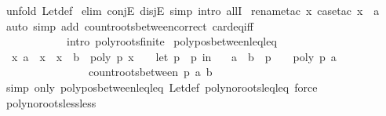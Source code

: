 \begin{isabellebody}
\isamarkupfalse%
\ {\isacharparenleft}unfold\ Let{\isacharunderscore}def{\isacharparenright}\isanewline
{}\isamarkupfalse%
\ {\isacharparenleft}elim\ conjE\ disjE{\isacharcomma}\ simp{\isacharcomma}\ intro\ allI{\isacharparenright}\isanewline
{}\isamarkupfalse%
\ {\isacharparenleft}rename{\isacharunderscore}tac\ x{\isacharcomma}\ case{\isacharunderscore}tac\ {\isachardoublequoteopen}x\ {\isacharequal}\ a{\isachardoublequoteclose}{\isacharparenright}\isanewline
{}\isamarkupfalse%
\ {\isacharparenleft}auto\ simp\ add{\isacharcolon}\ count{\isacharunderscore}roots{\isacharunderscore}between{\isacharunderscore}correct\ card{\isacharunderscore}eq{\isacharunderscore}{}{\isacharunderscore}iff\isanewline
\ \ \ \ \ \ \ \ \ \ \ \ intro{\isacharcolon}\ poly{\isacharunderscore}roots{\isacharunderscore}finite{\isacharparenright}\isanewline
{}\isamarkupfalse%
%
\endisatagproof
{\isafoldproof}%
%
\isadelimproof
\isanewline
%
\endisadelimproof
\isanewline
{}\isamarkupfalse%
\ poly{\isacharunderscore}pos{\isacharunderscore}between{\isacharunderscore}leq{\isacharunderscore}leq{\isacharcolon}\isanewline
\ \ {\isachardoublequoteopen}{\isacharparenleft}{\isasymforall}x{\isachardot}\ a\ {\isasymle}\ x\ {\isasymand}\ x\ {\isasymle}\ b\ {\isasymlongrightarrow}\ poly\ p\ x\ {\isachargreater}\ {}{\isacharparenright}\ {\isasymlongleftrightarrow}\ {\isacharparenleft}let\ p\ {\isacharequal}\ p\ in\isanewline
\ \ \ {\isacharparenleft}a\ {\isachargreater}\ b\ {\isasymor}\ {\isacharparenleft}p\ {\isasymnoteq}\ {}\ {\isasymand}\ poly\ p\ a\ {\isachargreater}\ {}\ {\isasymand}\ \isanewline
\ \ \ \ \ \ \ \ \ \ \ \ \ \ \ \ count{\isacharunderscore}roots{\isacharunderscore}between\ p\ a\ b\ {\isacharequal}\ {}{\isacharparenright}{\isacharparenright}{\isacharparenright}{\isachardoublequoteclose}\isanewline
%
\isadelimproof
%
\endisadelimproof
%
\isatagproof
{}\isamarkupfalse%
\ {\isacharparenleft}simp\ only{\isacharcolon}\ poly{\isacharunderscore}pos{\isacharunderscore}between{\isacharunderscore}leq{\isacharunderscore}leq\ Let{\isacharunderscore}def\ poly{\isacharunderscore}no{\isacharunderscore}roots{\isacharunderscore}leq{\isacharunderscore}leq{\isacharcomma}\ force{\isacharparenright}%
\endisatagproof
{\isafoldproof}%
%
\isadelimproof
\isanewline
%
\endisadelimproof
\isanewline
\isanewline
\isanewline
{}\isamarkupfalse%
\ poly{\isacharunderscore}no{\isacharunderscore}roots{\isacharunderscore}less{\isacharunderscore}less{\isacharcolon}\isanewline

\end{isabellebody}
